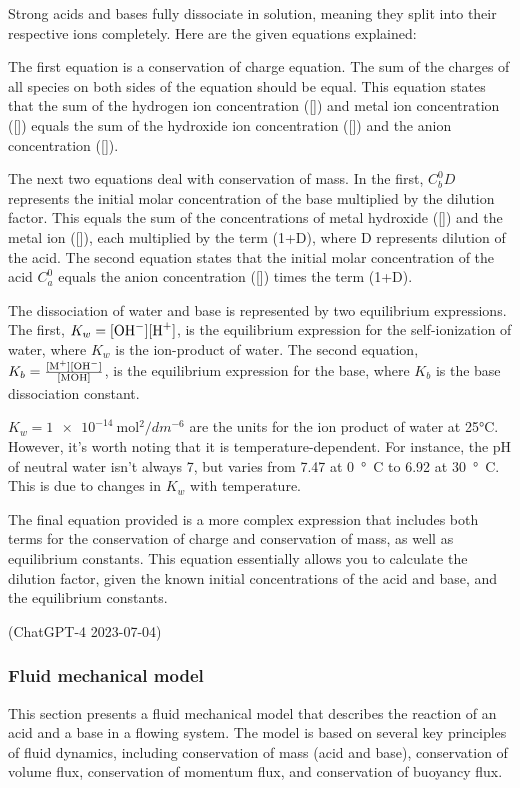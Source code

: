 \begin{quoting}
    Strong acids and bases fully dissociate in solution, meaning they split into their respective ions completely. Here are the given equations explained:

    The first equation is a conservation of charge equation. The sum of the charges of all species on both sides of the equation should be equal. This equation states that the sum of the hydrogen ion concentration ([]) and metal ion concentration ([]) equals the sum of the hydroxide ion concentration ([]) and the anion concentration ([]).

    The next two equations deal with conservation of mass. In the first, $C_b^0D$ represents the initial molar concentration of the base multiplied by the dilution factor. This equals the sum of the concentrations of metal hydroxide ([]) and the metal ion ([]), each multiplied by the term (1+D), where D represents dilution of the acid. The second equation states that the initial molar concentration of the acid $C_a^0$ equals the anion concentration ([]) times the term (1+D).

    The dissociation of water and base is represented by two equilibrium expressions. The first, $K_w = [\ce{OH^-}][\ce{H^+}]$, is the equilibrium expression for the self-ionization of water, where $K_w$ is the ion-product of water. The second equation, $K_b = \frac{[\ce{M^+}][\ce{OH^-}]}{[\ce{MOH}]}$, is the equilibrium expression for the base, where $K_b$ is the base dissociation constant.

    $K_w = \SI{1e-14}{\mol^2 / dm^{-6}}$ are the units for the ion product of water at 25°C. However, it's worth noting that it is temperature-dependent. For instance, the pH of neutral water isn't always 7, but varies from 7.47 at \SI{0}{\degree C} to 6.92 at \SI{30}{\degree C}. This is due to changes in $K_w$ with temperature.

    The final equation provided is a more complex expression that includes both terms for the conservation of charge and conservation of mass, as well as equilibrium constants. This equation essentially allows you to calculate the dilution factor, given the known initial concentrations of the acid and base, and the equilibrium constants.

    (ChatGPT-4 2023-07-04)
\end{quoting}
\subsubsection{Fluid mechanical model}
This section presents a fluid mechanical model that describes the reaction of an acid and a base in a flowing system. The model is based on several key principles of fluid dynamics, including conservation of mass (acid and base), conservation of volume flux, conservation of momentum flux, and conservation of buoyancy flux.

